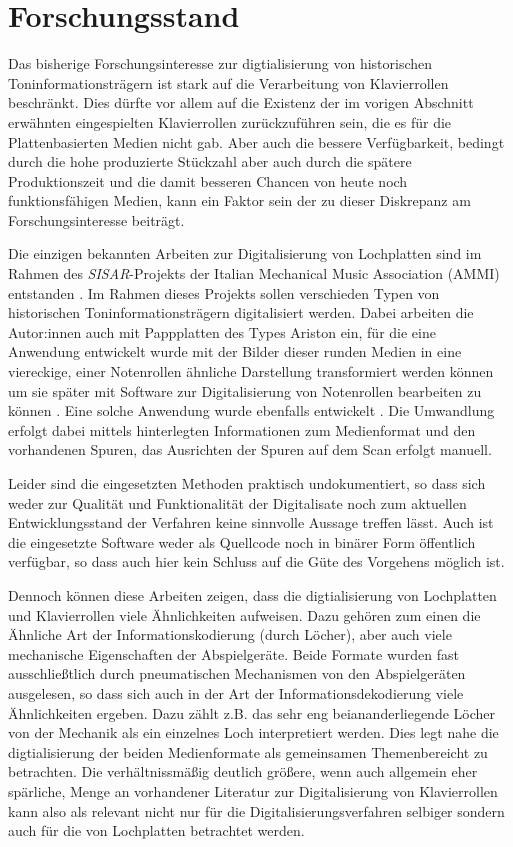 \section{Forschungsstand}

Das bisherige Forschungsinteresse zur digtialisierung von historischen Toninformationsträgern ist stark auf die Verarbeitung von Klavierrollen beschränkt.
Dies dürfte vor allem auf die Existenz der im vorigen Abschnitt erwähnten eingespielten Klavierrollen zurückzuführen sein, die es für die Plattenbasierten Medien nicht gab.
Aber auch die bessere Verfügbarkeit, bedingt durch die hohe produzierte Stückzahl aber auch durch die spätere Produktionszeit und die damit besseren Chancen von heute noch funktionsfähigen Medien, kann ein Faktor sein der zu dieser Diskrepanz am Forschungsinteresse beiträgt.

Die einzigen bekannten Arbeiten zur Digitalisierung von Lochplatten sind im Rahmen des \textit{SISAR}-Projekts der Italian Mechanical Music Association (AMMI) entstanden \parencite[]{pedrazzini_2013,perretti_2014}.
Im Rahmen dieses Projekts sollen verschieden Typen von historischen Toninformationsträgern digitalisiert werden.
Dabei arbeiten die Autor:innen auch mit Pappplatten des Types Ariston ein, für die eine Anwendung entwickelt wurde mit der Bilder dieser runden Medien in eine viereckige, einer Notenrollen ähnliche Darstellung transformiert werden können um sie später mit Software zur Digitalisierung von Notenrollen bearbeiten zu können \parencite[]{perretti_2014}.
Eine solche Anwendung wurde ebenfalls entwickelt \parencite[]{conversion}.
Die Umwandlung erfolgt dabei mittels hinterlegten Informationen zum Medienformat und den vorhandenen Spuren, das Ausrichten der Spuren auf dem Scan erfolgt manuell.

Leider sind die eingesetzten Methoden praktisch undokumentiert, so dass sich weder zur Qualität und Funktionalität der Digitalisate noch zum aktuellen Entwicklungsstand der Verfahren keine sinnvolle Aussage treffen lässt.
Auch ist die eingesetzte Software weder als Quellcode noch in binärer Form öffentlich verfügbar, so dass auch hier kein Schluss auf die Güte des Vorgehens möglich ist.

Dennoch können diese Arbeiten zeigen, dass die digtialisierung von Lochplatten und Klavierrollen viele Ähnlichkeiten aufweisen.
Dazu gehören zum einen die Ähnliche Art der Informationskodierung (durch Löcher), aber auch viele mechanische Eigenschaften der Abspielgeräte.
Beide Formate wurden fast ausschließtlich durch pneumatischen Mechanismen von den Abspielgeräten ausgelesen, so dass sich auch in der Art der Informationsdekodierung viele Ähnlichkeiten ergeben.
Dazu zählt z.B. das sehr eng beiananderliegende Löcher von der Mechanik als ein einzelnes Loch interpretiert werden.
Dies legt nahe die digtialisierung der beiden Medienformate als gemeinsamen Themenbereicht zu betrachten.
Die verhältnissmäßig deutlich größere, wenn auch allgemein eher spärliche, Menge an vorhandener Literatur zur Digitalisierung von Klavierrollen kann also als relevant nicht nur für die Digitalisierungsverfahren selbiger sondern auch für die von Lochplatten betrachtet werden.

